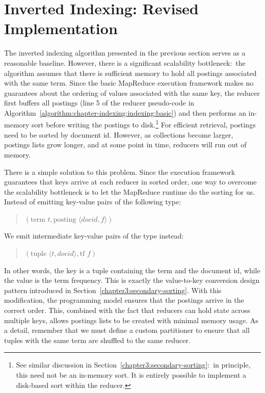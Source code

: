 \section{Inverted Indexing: Revised Implementation}
\label{chapter-indexing:index:revised}

The inverted indexing algorithm presented in the previous section
serves as a reasonable baseline.  However, there is a significant
scalability bottleneck:\ the algorithm assumes that there is
sufficient memory to hold all postings associated with the same term.
Since the basic MapReduce execution framework makes no guarantees
about the ordering of values associated with the same key, the reducer
first buffers all postings (line 5 of the reducer pseudo-code in
Algorithm~\ref{algorithm:chapter-indexing:indexing:basic}) and then performs an
in-memory sort before writing the postings to disk.\footnote{See
  similar discussion in Section~\ref{chapter3:secondary-sorting}:\ in
  principle, this need not be an in-memory sort.  It is entirely
  possible to implement a disk-based sort within the reducer.}  For
efficient retrieval, postings need to be sorted by document id.
However, as collections become larger, postings lists grow longer, and
at some point in time, reducers will run out of memory.

There is a simple solution to this problem.  Since the execution
framework guarantees that keys arrive at each reducer in sorted order,
one way to overcome the scalability bottleneck is to let the MapReduce
runtime do the sorting for us.  Instead of emitting key-value pairs of
the following type:

\begin{quote}
$(\textrm{term }t, \textrm{posting }\langle docid, f \rangle )$
\end{quote}

\noindent We emit intermediate key-value pairs of the type instead:

\begin{quote}
$(\textrm{tuple }\langle t, docid \rangle, \textrm{tf }f )$
\end{quote}

\noindent In other words, the key is a tuple containing the term and
the document id, while the value is the term frequency.  This is
exactly the value-to-key conversion design pattern introduced in
Section~\ref{chapter3:secondary-sorting}.  With this modification, the
programming model ensures that the postings arrive in the correct
order.  This, combined with the fact that reducers can hold state
across multiple keys, allows postings lists to be created with minimal
memory usage.  As a detail, remember that we must define a custom
partitioner to ensure that all tuples with the same term are shuffled
to the same reducer.

